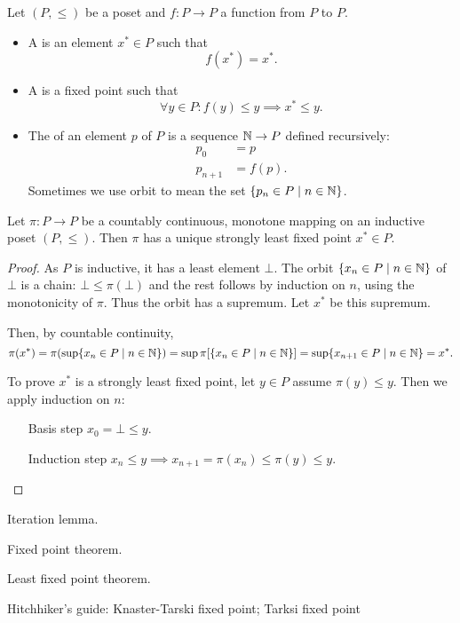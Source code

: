 \begin{definition}
Let $(P,\leq)$ be a poset and $f: P\to P$ a function from $P$ to $P$.
\begin{itemize}
\item A  is an element $x^*\in P$ such that
\[ f(x^*) = x^*. \]
\item A  is a fixed point such that
\[ \forall y\in P: f(y)\leq y \implies x^* \leq y. \]
\item The  of an element $p$ of $P$ is a sequence $\mathbb{N}\to P$ defined recursively:
\begin{align*}
p_0 &= p \\
p_{n+1} &= f(p).
\end{align*}
Sometimes we use orbit to mean the set $\{p_n\in P\;|\; n\in \mathbb{N}\}$.
\end{itemize}
\end{definition}

\begin{theorem}
Let $\pi:P\to P$ be a countably continuous, monotone mapping on an inductive poset $(P,\leq)$. Then $\pi$ has a unique strongly least fixed point $x^*\in P$.
\end{theorem}
\begin{proof}
As $P$ is inductive, it has a least element $\bot$. The orbit $\{x_n\in P\;|\; n\in \mathbb{N}\}$ of $\bot$ is a chain: $\bot \leq \pi(\bot)$ and the rest follows by induction on $n$, using the monotonicity of $\pi$. Thus the orbit has a supremum. Let $x^*$ be this supremum.

Then, by countable continuity,
\[ \pi(x^*) = \pi(\sup\{x_n\in P\;|\; n\in \mathbb{N}\}) = \sup\pi[\{x_n\in P\;|\; n\in \mathbb{N}\}] = \sup\{x_{n+1}\in P\;|\; n\in \mathbb{N}\} = x^*. \]

To prove $x^*$ is a strongly least fixed point, let $y\in P$ assume $\pi(y)\leq y$. Then we apply induction on $n$:
\begin{itemize}[leftmargin=3cm]
\item[Basis step] $x_0 = \bot \leq y$.
\item[Induction step] $x_n \leq y \implies x_{n+1} = \pi(x_n)\leq \pi(y) \leq y$.
\end{itemize}
\end{proof}

Iteration lemma.

Fixed point theorem.

Least fixed point theorem.

Hitchhiker's guide:
Knaster-Tarski fixed point; Tarksi fixed point

